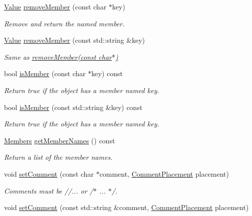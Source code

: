 \begin{DoxyCompactItemize}
\hyperlink{classJson_1_1Value}{Value} \hyperlink{classJson_1_1Value_aa52f7873b95d29627d6e83ba96f69aaa}{remove\-Member} (const char $\ast$key)
\begin{DoxyCompactList}\small\item\em Remove and return the named member. \end{DoxyCompactList}\item 
\hyperlink{classJson_1_1Value}{Value} \hyperlink{classJson_1_1Value_ae1f95f7ca3906e6bcc2a7be93210ecba}{remove\-Member} (const std\-::string \&key)
\begin{DoxyCompactList}\small\item\em Same as \hyperlink{classJson_1_1Value_aa52f7873b95d29627d6e83ba96f69aaa}{remove\-Member(const char$\ast$)} \end{DoxyCompactList}\item 
bool \hyperlink{classJson_1_1Value_a196defba501d70ea2b6793afb04108e3}{is\-Member} (const char $\ast$key) const 
\begin{DoxyCompactList}\small\item\em Return true if the object has a member named key. \end{DoxyCompactList}\item 
bool \hyperlink{classJson_1_1Value_af728b5738aaa133f3aad2e39dc4f415e}{is\-Member} (const std\-::string \&key) const 
\begin{DoxyCompactList}\small\item\em Return true if the object has a member named key. \end{DoxyCompactList}\item 
\hyperlink{classJson_1_1Value_ac61bab5a465848b57610379cc07995c3}{Members} \hyperlink{classJson_1_1Value_a179f6d002c2bb916ce0d0b9db9b87ebe}{get\-Member\-Names} () const 
\begin{DoxyCompactList}\small\item\em Return a list of the member names. \end{DoxyCompactList}\item 
void \hyperlink{classJson_1_1Value_a29f3a30f7e5d3af6f38d57999bf5b480}{set\-Comment} (const char $\ast$comment, \hyperlink{namespaceJson_a4fc417c23905b2ae9e2c47d197a45351}{Comment\-Placement} placement)
\begin{DoxyCompactList}\small\item\em Comments must be //... or /$\ast$ ... $\ast$/. \end{DoxyCompactList}\item 
void \hyperlink{classJson_1_1Value_a6d68a2e7d4e1e317cd9e812e12181689}{set\-Comment} (const std\-::string \&comment, \hyperlink{namespaceJson_a4fc417c23905b2ae9e2c47d197a45351}{Comment\-Placement} placement)

\end{DoxyCompactItemize}
